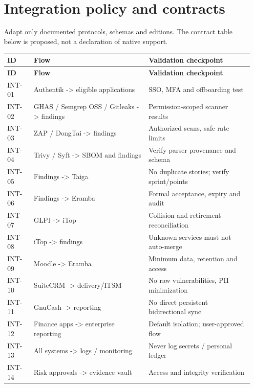 \documentclass[10pt,letterpaper]{article}
\begin{document}
\section{Integration policy and contracts}
Adapt only documented protocols, schemas and editions. The contract table below is proposed, not a declaration of native support.\par
\small\begin{longtable}{>{\raggedright\arraybackslash}p{}>{\raggedright\arraybackslash}p{}>{\raggedright\arraybackslash}p{}}
\toprule
\textbf{ID} & \textbf{Flow} & \textbf{Validation checkpoint}\\
\midrule\endfirsthead
\toprule
\textbf{ID} & \textbf{Flow} & \textbf{Validation checkpoint}\\
\midrule\endhead
INT-01 & Authentik -> eligible applications & SSO, MFA and offboarding test\\
INT-02 & GHAS / Semgrep OSS / Gitleaks -> findings & Permission-scoped scanner results\\
INT-03 & ZAP / DongTai -> findings & Authorized scans, safe rate limits\\
INT-04 & Trivy / Syft -> SBOM and findings & Verify parser provenance and schema\\
INT-05 & Findings -> Taiga & No duplicate stories; verify sprint/points\\
INT-06 & Findings -> Eramba & Formal acceptance, expiry and audit\\
INT-07 & GLPI -> iTop & Collision and retirement reconciliation\\
INT-08 & iTop -> findings & Unknown services must not auto-merge\\
INT-09 & Moodle -> Eramba & Minimum data, retention and access\\
INT-10 & SuiteCRM -> delivery/ITSM & No raw vulnerabilities, PII minimization\\
INT-11 & GnuCash -> reporting & No direct persistent bidirectional sync\\
INT-12 & Finance apps -> enterprise reporting & Default isolation; user-approved flow\\
INT-13 & All systems -> logs / monitoring & Never log secrets / personal ledger\\
INT-14 & Risk approvals -> evidence vault & Access and integrity verification\\
\bottomrule
\end{longtable}
\normalsize
\end{document}
